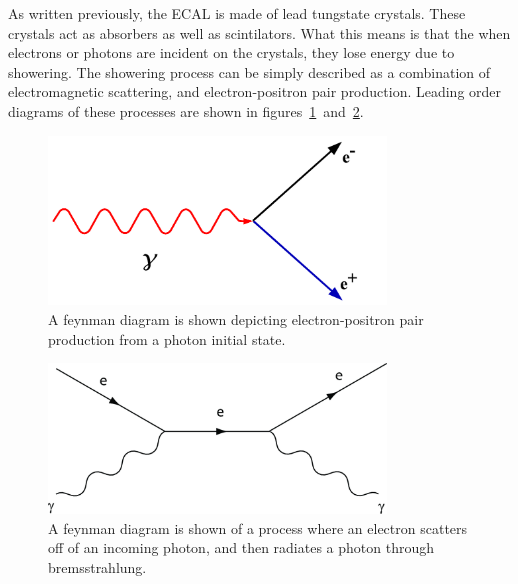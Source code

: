 \clearpage

As written previously, the ECAL is made of lead tungstate crystals.
These crystals act as absorbers as well as scintilators.
What this means is that the when electrons or photons are incident on the crystals, they lose energy due to showering.
The showering process can be simply described as a combination of electromagnetic scattering, and electron-positron pair production.
Leading order diagrams of these processes are shown in figures~\ref{fig:pair_production}~and~\ref{fig:photon_brem}.

\begin{figure}[!ht]
\begin{center}
\includegraphics[width=0.8\textwidth]{cms/figs/Pair_Production.png}
\caption{ A feynman diagram is shown depicting electron-positron pair production from a photon initial state.
\label{fig:pair_production}
}
\end{center}
\end{figure}

\begin{figure}[!ht]
\begin{center}
\includegraphics[width=0.8\textwidth]{cms/figs/photon_brem.png}
\caption{
  A feynman diagram is shown of a process where an electron scatters off of an incoming photon,
  and then radiates a photon through bremsstrahlung.
\label{fig:photon_brem}
}
\end{center}
\end{figure}

